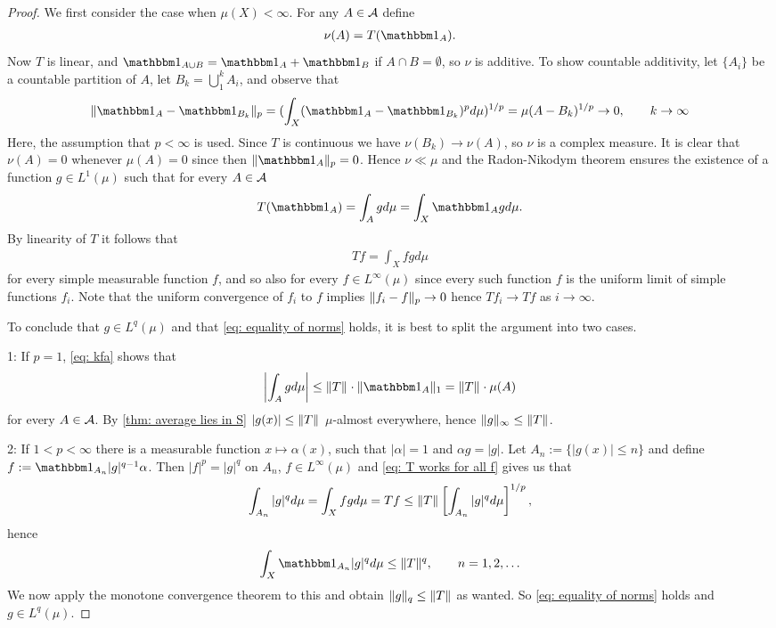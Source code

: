 \begin{proof}
We first consider the case when $\mu(X)<\infty$. For any $A\in \m{A}$ define
\begin{align*}
	\nu(A)=T(\ind{A}).
\end{align*}
Now $T$ is linear, and $\ind{A\cup B}=\ind{A}+\ind{B}$ if $A\cap B=\emptyset$, so $\nu$ is additive. To show countable additivity, let $\{A_{i}\}$ be a countable partition of $A$, let $B_{k}=\bigcup_{1}^{k}A_{i}$, and observe that
\begin{align*}
	\norm[p]{\ind{A} -  \ind{B_{k}} }=(\int_{X}(\ind{A} -  \ind{B_{k}})^{p} d\mu)^{1/p}=\mu(A-B_{k})^{1/p}\to 0, \qquad k\to \infty
\end{align*}
Here, the assumption that $p<\infty$ is used. Since $T$ is continuous we have $\nu(B_{k})\to \nu(A)$, so $\nu$ is a complex measure. It is clear that $\nu(A)=0$ whenever $\mu(A)=0$ since then $\norm[p]{\ind{A}}=0$. Hence $\nu \ll \mu$ and the Radon-Nikodym theorem ensures the existence of a function $g\in L^{1}(\mu)$  such that for every $A\in \m{A}$
\begin{align}
	T(\ind{A})=\int_{A}gd\mu=\int_{X}\ind{A}gd\mu. \label{eq: kfa}
\end{align}
By linearity of $T$ it follows that 
\begin{align}
	Tf=\int_{X}fgd\mu \label{eq: T works for all f}
\end{align}
for every simple measurable function $f$, and so also for every $f\in L^{\infty}(\mu)$ since every such function $f$ is the uniform limit of simple functions $f_{i}$. Note that the uniform convergence of $f_{i}$ to $f$ implies $\norm[p]{f_{i}-f}\to 0$ hence $Tf_{i}\to Tf$ as $i\to \infty$.

To conclude that $g\in L^{q}(\mu)$ and that \eqref{eq: equality of norms} holds, it is best to split the argument into two cases.

1: If $p=1$, \eqref{eq: kfa} shows that
\begin{align*}
	\left| \int_{A}gd\mu\right| \le \norm{T}\cdot \norm[1]{\ind{A}}=\norm{T}\cdot\mu(A)
\end{align*}
for every $A\in \m{A}$. By \cref{thm: average lies in S} $|g(x)|\le \norm{T}$ $\mu$-almost everywhere, hence $\norm[\infty]{g}\le \norm{T}$.

2: If $1<p<\infty$ there is a measurable function $x\mapsto \alpha(x)$, such that $|\alpha|=1$ and $\alpha g=|g|$. Let $A_{n}:=\{|g(x)|\le n\}$ and define $f:=\ind{A_{n}}|g|^{q-1}\alpha$. Then $|f|^{p}=|g|^{q}$ on $A_{n}$, $f\in L^{\infty}(\mu)$ and \eqref{eq: T works for all f} gives us that
\begin{align*}
	\int_{A_{n}}|g|^{q}d\mu=\int_{X}fgd\mu=Tf\le \norm{T}\left[ \int_{A_{n}}|g|^{q}d\mu \right]^{1/p},
\end{align*}
hence
\begin{align*}
	\int_{X}\ind{A_{n}}|g|^{q}d\mu \le \norm{T}^{q}, \qquad n=1,2, \dots
\end{align*}
We now apply the monotone convergence theorem to this and obtain $\norm[q]{g}\le \norm{T}$ as wanted. So \eqref{eq: equality of norms} holds and $g\in L^{q}(\mu)$.


\end{proof}
